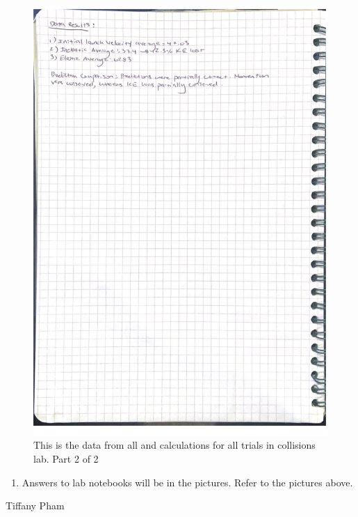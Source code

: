 \documentclass[idxtotoc,hyperref,openany]{labbook} %
\begin{document}
\begin{figure}[H] %
\begin{center}
\includegraphics[width=0.8\linewidth]{images/Lab.07/Lab07Calc2.png}
\end{center}
\caption{This is the data from all and calculations for all trials in collisions lab. Part 2 of 2}
\label{fig:Lab07Calc2}
\end{figure}


\begin{enumerate}
    \item Answers to lab notebooks will be in the pictures. Refer to the pictures above.
\end{enumerate}



\vspace{-5mm}
Tiffany Pham
\end{document}
